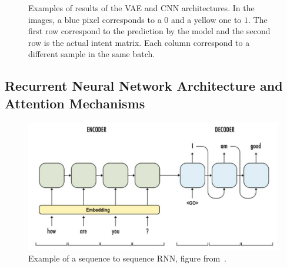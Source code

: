 \begin{figure}
    \centering
    \caption{Examples of results of the VAE and CNN architectures. In the images, a blue pixel corresponds to a $0$ and a yellow one to $1$. The first row correspond to the prediction by the model and the second row is the actual intent matrix. Each column correspond to a different sample in the same batch.}
\end{figure}

\subsection{Recurrent Neural Network Architecture and Attention Mechanisms} \label{sec:prelim-lstm}
\begin{figure}
    \centering
    \includegraphics[width = .8\textwidth, height = .4\textwidth, keepaspectratio]{Figures/Ch3/seq2seq.png}
    \caption{Example of a sequence to sequence RNN, figure from~\cite{nlp:2018:aditya}.}
    \label{fig:seq2seq}
\end{figure}

